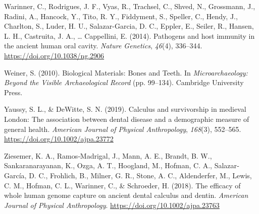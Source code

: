 \documentclass[
  letterpaper,
]{book}
\newlength{\cslhangindent}
\newlength{\cslentryspacingunit} %
\newenvironment{CSLReferences}[2] %
 {%
  \setlength{\parindent}{0pt}
  \ifodd #1
  \let\oldpar\par
  \def\par{\hangindent=\cslhangindent\oldpar}
  \fi
  \setlength{\parskip}{#2\cslentryspacingunit}
 }%
 {}
\begin{document}
\begin{CSLReferences}{1}{0}
\leavevmode{}%
Warinner, C., Rodrigues, J. F., Vyas, R., Trachsel, C., Shved, N.,
Grossmann, J., Radini, A., Hancock, Y., Tito, R. Y., Fiddyment, S.,
Speller, C., Hendy, J., Charlton, S., Luder, H. U., Salazar-Garcia, D.
C., Eppler, E., Seiler, R., Hansen, L. H., Castruita, J. A., \ldots{}
Cappellini, E. (2014). Pathogens and host immunity in the ancient human
oral cavity. \emph{Nature Genetics}, \emph{46}(4), 336--344.
\url{https://doi.org/10.1038/ng.2906}

\leavevmode{}%
Weiner, S. (2010). Biological {Materials}: {Bones} and {Teeth}. In
\emph{Microarchaeology: {Beyond} the {Visible Archaeological Record}}
(pp. 99--134). {Cambridge University Press}.

\leavevmode{}%
Yaussy, S. L., \& DeWitte, S. N. (2019). Calculus and survivorship in
medieval {London}: {The} association between dental disease and a
demographic measure of general health. \emph{American Journal of
Physical Anthropology}, \emph{168}(3), 552--565.
\url{https://doi.org/10.1002/ajpa.23772}

\leavevmode{}%
Ziesemer, K. A., Ramos‐Madrigal, J., Mann, A. E., Brandt, B. W.,
Sankaranarayanan, K., Ozga, A. T., Hoogland, M., Hofman, C. A.,
Salazar‐García, D. C., Frohlich, B., Milner, G. R., Stone, A. C.,
Aldenderfer, M., Lewis, C. M., Hofman, C. L., Warinner, C., \&
Schroeder, H. (2018). The efficacy of whole human genome capture on
ancient dental calculus and dentin. \emph{American Journal of Physical
Anthropology}. \url{https://doi.org/10.1002/ajpa.23763}

\end{CSLReferences}
\end{document}

